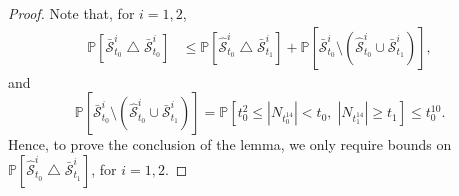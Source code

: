 \documentclass[10pt,a4paper]{amsart}
\def\P{{\mathbb P}}
\newcommand{\Sccc}{\bar{\mathcal S}}
\newcommand{\Scc}{\hat{\mathcal S}}
\begin{document}
\begin{proof}
    Note that, for $i = 1, 2$,
    \begin{equation}
    	\begin{split}
    		\P [ \Sccc^i_{t_0} \bigtriangleup \Sccc^i_{t_0}] & \leq \P [\Scc^i_{t_0} \bigtriangleup \Sccc^i_{t_1}] + \P[\Sccc^i_{t_0} \setminus (\Scc^i_{t_0} \cup \Sccc^i_{t_1})],
    	\end{split}
    \end{equation}
    and
    \begin{equation}
    	\P[\Sccc^i_{t_0} \setminus (\Scc^i_{t_0} \cup \Sccc^i_{t_1})] = \P[t_0^2 \leq |N_{t_0^{14}}| < t_0, \; |N_{t_1^{14}}| \geq t_1] \leq t_0^{10}.
    \end{equation}
    Hence, to prove the conclusion of the lemma, we only require bounds on $\P [\Scc^i_{t_0} \bigtriangleup \Sccc^i_{t_1}]$, for $i = 1, 2$.
   

\end{proof}
\end{document}
